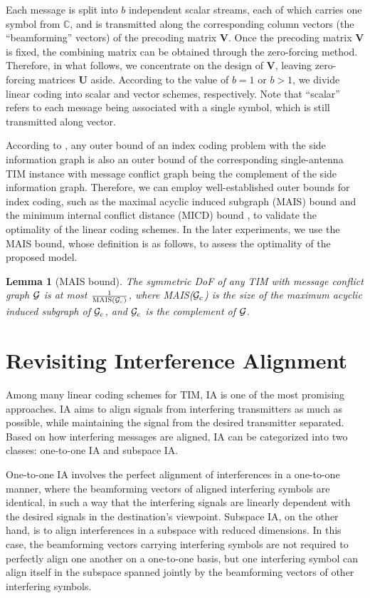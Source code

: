 \documentclass[a4paper,journal]{IEEEtran}
\def\C {\mathbb{C}}
\newtheorem{lem}{Lemma}
\begin{document}
Each message is split into $b$ independent scalar streams, each of which carries one symbol from $\C$, and is transmitted
along the corresponding column vectors (the ``beamforming'' vectors) of the precoding matrix $\mathbf{V}$. Once the precoding matrix $\mathbf{V}$ is fixed, the combining matrix can be obtained through the zero-forcing method. Therefore, in what follows, we concentrate on the design of $\mathbf{V}$, leaving zero-forcing matrices $\mathbf{U}$ aside. According to the value of $b=1$ or $b>1$, we divide linear coding into scalar and vector schemes, respectively. Note that ``scalar'' refers to each message being associated with a single symbol, which is still transmitted along vector.

According to \cite{jafar2013topological}, any outer bound of an index coding problem with the side information graph is also an outer bound of the corresponding single-antenna TIM instance with message conflict graph being the complement of the side information graph.
Therefore, we can employ well-established outer bounds for index coding, such as the maximal acyclic induced subgraph (MAIS) bound \cite{bar2011index} and the minimum internal conflict distance (MICD) bound \cite{jafar2013topological}, to validate the optimality of the linear coding schemes. In the later experiments, we use the MAIS bound, whose definition is as follows, to assess the optimality of the proposed model.
{
\begin{lem}[MAIS bound]
The symmetric DoF of any TIM with message conflict graph ${\mathcal{G}}$ is at most $\frac{1}{\textsc{MAIS}({\mathcal{G}}_c)}$, where \textsc{MAIS}(${\mathcal{G}}_c$) is the size of the maximum acyclic induced subgraph of ${\mathcal{G}}_c$, and ${\mathcal{G}}_c$ is the complement of ${\mathcal{G}}$.
\end{lem}
}

\section{Revisiting Interference Alignment}\label{Interference Alignment Perspective}

Among many linear coding schemes for TIM, IA is one of the most promising approaches. IA aims to align signals from interfering transmitters as much as possible, while maintaining the signal from the desired transmitter separated. 
% 
Based on how interfering messages are aligned, IA can be categorized into two classes: one-to-one IA and subspace IA. 

One-to-one IA involves the perfect alignment of interferences in a one-to-one manner, where the beamforming vectors of aligned interfering symbols are identical, in such a way that the interfering signals are linearly dependent with the desired signals in the destination's viewpoint.
Subspace IA, on the other hand, is to align interferences in a subspace with reduced dimensions.
In this case, the beamforming vectors carrying interfering symbols are not required to perfectly align one another on a one-to-one basis, but one interfering symbol can align itself in the subspace spanned jointly by the beamforming vectors of other interfering symbols.
\end{document}
